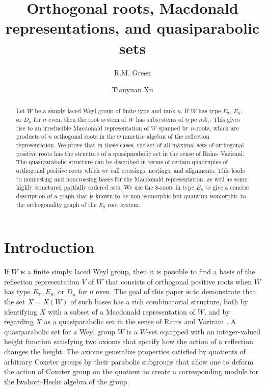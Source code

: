 \documentclass[11pt]{amsart}
\title{Orthogonal roots, Macdonald representations, and quasiparabolic
sets}
\author{R.M. Green}
\author{Tianyuan Xu}
\theoremstyle{plain}
\theoremstyle{definition}
\theoremstyle{remark}
\numberwithin{equation}{subsection}
\newcommand{\fh}{V}
\begin{document}
 \maketitle

\begin{abstract}
Let $W$ be a simply laced Weyl group of finite type and rank $n$.  If $W$ has
type $E_7$, $E_8$, or $D_n$ for $n$ even, then the root system of $W$ has
subsystems of type $nA_1$.  This gives rise to an irreducible Macdonald
representation of $W$ spanned by $n$-roots, which are products of $n$ orthogonal
roots in the symmetric algebra of the reflection representation.  We prove that
in these cases, the set of all maximal sets of orthogonal positive roots has the
structure of a quasiparabolic set in the sense of Rains--Vazirani.  The
quasiparabolic structure can be described in terms of certain quadruples of
orthogonal positive roots which we call crossings, nestings, and alignments.
This leads to nonnesting and noncrossing bases for the Macdonald representation,
as well as some highly structured partially ordered sets. We use the $8$-roots
in type $E_8$ to give a concise description of a graph that is known to be
non-isomorphic but quantum isomorphic to the orthogonality graph of the $E_8$
root system.
\end{abstract}




\section{Introduction}


If $W$ is a finite simply laced Weyl group, then it is possible to find a basis
of the reflection representation $\fh$ of $W$ that consists of orthogonal
positive roots when $W$ has type $E_7$, $E_8$, or $D_n$ for $n$ even. The goal
of this paper is to demonstrate that the set $X=X(W)$ of such bases has a rich
combinatorial structure, both by identifying $X$ with a subset of a Macdonald
representation of $W$, and by regarding $X$ as a quasiparabolic set in the sense
of Rains and Vazirani \cite{rains13}.  A {quasiparabolic set} for a Weyl group
$W$ is a $W$-set equipped with an integer-valued height function satisfying two
axioms that specify how the action of a reflection changes the height. The
axioms generalize properties satisfied by quotients of arbitrary Coxeter groups
by their parabolic subgroups that allow one to deform the action of Coxeter
group on the quotient to create a corresponding module for the Iwahori--Hecke
algebra of the group. 
\end{document}
